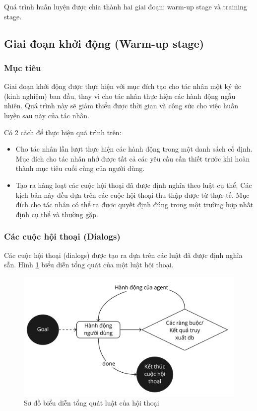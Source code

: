 Quá trình huấn luyện được chia thành hai giai đoạn: warm-up stage
và training stage.

\subsection{Giai đoạn khởi động (Warm-up stage)}
\subsubsection{Mục tiêu}
Giai đoạn khởi động được thực hiện với mục đích tạo cho tác nhân một
ký ức (kinh nghiệm) ban đầu, thay vì cho tác nhân thực hiện các
hành động ngẫu nhiên. Quá trình này sẽ giảm thiểu được thời gian
và công sức cho việc huấn luyện sau này của tác nhân.

Có 2 cách để thực hiện quá trình trên:
\begin{itemize}
    \item Cho tác nhân lần lượt thực hiện các hành động trong một
    danh sách cố định. Mục đích cho tác nhân nhớ được tất cả các
    yêu cầu cần thiết trước khi hoàn thành mục tiêu cuối cùng
    của người dùng.
    \item Tạo ra hàng loạt các cuộc hội thoại đã được định nghĩa
    theo luật cụ thể. Các kịch bản này đều dựa trên các cuộc
    hội thoại thu thập được từ thực tế. Mục đích cho tác nhân
    có thể ra được quyết định đúng trong một trường hợp
    nhất định cụ thể và thường gặp.
\end{itemize}

\subsubsection{Các cuộc hội thoại (Dialogs)}
\label{subsubsec:dialog}
Các cuộc hội thoại (dialogs) được tạo ra dựa trên các luật đã được
định nghĩa sẵn. Hình \ref{fig:dialog} biểu diễn tổng quát
của một luật hội thoại.

\begin{figure}[ht!]
    \centering
    \includegraphics[scale=0.16]{thesis/chatbot/phuongphap/img/dialog.jpg}
    \caption{Sơ đồ biểu diễn tổng quát luật của hội thoại}
    \label{fig:dialog}
\end{figure}

